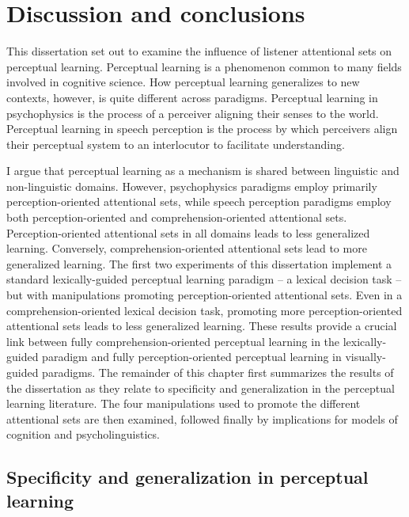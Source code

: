 
\chapter{Discussion and conclusions}
\label{chap:conclusion}

This dissertation set out to examine the influence of listener attentional sets on perceptual learning.
Perceptual learning is a phenomenon common to many fields involved in cognitive science.
How perceptual learning generalizes to new contexts, however, is quite different across paradigms.
Perceptual learning in psychophysics is the process of a perceiver aligning their senses to the world.
Perceptual learning in speech perception is the process by which perceivers align their perceptual system to an interlocutor to facilitate understanding.

I argue that perceptual learning as a mechanism is shared between linguistic and non-linguistic domains.
However, psychophysics paradigms employ primarily perception-oriented attentional sets, while speech perception paradigms employ both perception-oriented and comprehension-oriented attentional sets.
Perception-oriented attentional sets in all domains leads to less generalized learning.
Conversely, comprehension-oriented attentional sets lead to more generalized learning.
The first two experiments of this dissertation implement a standard lexically-guided perceptual learning paradigm -- a lexical decision task -- but with manipulations promoting perception-oriented attentional sets.
Even in a comprehension-oriented lexical decision task, promoting more perception-oriented attentional sets leads to less generalized learning.
These results provide a crucial link between fully comprehension-oriented perceptual learning in the lexically-guided paradigm and fully perception-oriented perceptual learning in visually-guided paradigms.
The remainder of this chapter first summarizes the results of the dissertation as they relate to specificity and generalization in the perceptual learning literature.
The four manipulations used to promote the different attentional sets are then examined, followed finally by implications for models of cognition and psycholinguistics.

\section{Specificity and generalization in perceptual learning}

